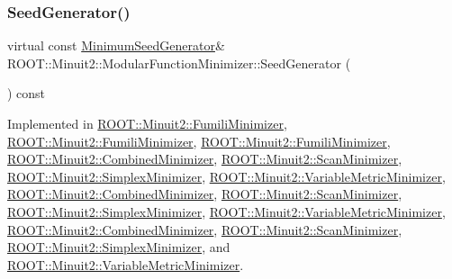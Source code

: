 \subsubsection{\texorpdfstring{SeedGenerator()}{SeedGenerator()}\hspace{0.1cm}{\footnotesize\ttfamily [2/3]}}
{\footnotesize\ttfamily virtual const \mbox{\hyperlink{classROOT_1_1Minuit2_1_1MinimumSeedGenerator}{Minimum\+Seed\+Generator}}\& R\+O\+O\+T\+::\+Minuit2\+::\+Modular\+Function\+Minimizer\+::\+Seed\+Generator (\begin{DoxyParamCaption}{ }\end{DoxyParamCaption}) const\hspace{0.3cm}{\ttfamily [pure virtual]}}



Implemented in \mbox{\hyperlink{classROOT_1_1Minuit2_1_1FumiliMinimizer_ad8906dbac7f0c20284e361be606d5634}{R\+O\+O\+T\+::\+Minuit2\+::\+Fumili\+Minimizer}}, \mbox{\hyperlink{classROOT_1_1Minuit2_1_1FumiliMinimizer_ad8906dbac7f0c20284e361be606d5634}{R\+O\+O\+T\+::\+Minuit2\+::\+Fumili\+Minimizer}}, \mbox{\hyperlink{classROOT_1_1Minuit2_1_1FumiliMinimizer_ad8906dbac7f0c20284e361be606d5634}{R\+O\+O\+T\+::\+Minuit2\+::\+Fumili\+Minimizer}}, \mbox{\hyperlink{classROOT_1_1Minuit2_1_1CombinedMinimizer_a667ce6c321b6948d37087a2ac06be58c}{R\+O\+O\+T\+::\+Minuit2\+::\+Combined\+Minimizer}}, \mbox{\hyperlink{classROOT_1_1Minuit2_1_1ScanMinimizer_aaad34811cf2862cd8b66b634a1c9ba07}{R\+O\+O\+T\+::\+Minuit2\+::\+Scan\+Minimizer}}, \mbox{\hyperlink{classROOT_1_1Minuit2_1_1SimplexMinimizer_a7385d3ee5e4a48a796b11b51f7f0c408}{R\+O\+O\+T\+::\+Minuit2\+::\+Simplex\+Minimizer}}, \mbox{\hyperlink{classROOT_1_1Minuit2_1_1VariableMetricMinimizer_a8ac2123142283dd05611842236caeadb}{R\+O\+O\+T\+::\+Minuit2\+::\+Variable\+Metric\+Minimizer}}, \mbox{\hyperlink{classROOT_1_1Minuit2_1_1CombinedMinimizer_a667ce6c321b6948d37087a2ac06be58c}{R\+O\+O\+T\+::\+Minuit2\+::\+Combined\+Minimizer}}, \mbox{\hyperlink{classROOT_1_1Minuit2_1_1ScanMinimizer_aaad34811cf2862cd8b66b634a1c9ba07}{R\+O\+O\+T\+::\+Minuit2\+::\+Scan\+Minimizer}}, \mbox{\hyperlink{classROOT_1_1Minuit2_1_1SimplexMinimizer_a7385d3ee5e4a48a796b11b51f7f0c408}{R\+O\+O\+T\+::\+Minuit2\+::\+Simplex\+Minimizer}}, \mbox{\hyperlink{classROOT_1_1Minuit2_1_1VariableMetricMinimizer_a8ac2123142283dd05611842236caeadb}{R\+O\+O\+T\+::\+Minuit2\+::\+Variable\+Metric\+Minimizer}}, \mbox{\hyperlink{classROOT_1_1Minuit2_1_1CombinedMinimizer_a667ce6c321b6948d37087a2ac06be58c}{R\+O\+O\+T\+::\+Minuit2\+::\+Combined\+Minimizer}}, \mbox{\hyperlink{classROOT_1_1Minuit2_1_1ScanMinimizer_aaad34811cf2862cd8b66b634a1c9ba07}{R\+O\+O\+T\+::\+Minuit2\+::\+Scan\+Minimizer}}, \mbox{\hyperlink{classROOT_1_1Minuit2_1_1SimplexMinimizer_a7385d3ee5e4a48a796b11b51f7f0c408}{R\+O\+O\+T\+::\+Minuit2\+::\+Simplex\+Minimizer}}, and \mbox{\hyperlink{classROOT_1_1Minuit2_1_1VariableMetricMinimizer_a8ac2123142283dd05611842236caeadb}{R\+O\+O\+T\+::\+Minuit2\+::\+Variable\+Metric\+Minimizer}}.

